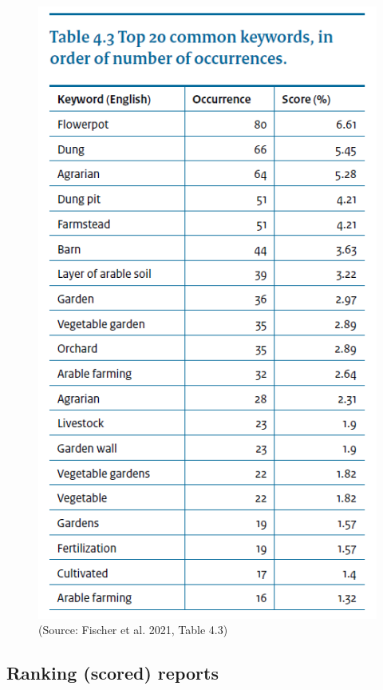 \documentclass[
  letterpaper,
  DIV=11,
  numbers=noendperiod]{scrartcl}
\begin{document}
\begin{figure}

{\centering \includegraphics{images/Table_4.3.png}

}

\caption{(Source: Fischer et al. 2021, Table 4.3)}

\end{figure}

\hypertarget{ranking-scored-reports}{%
\subsection{Ranking (scored) reports}\label{ranking-scored-reports}}
\end{document}
